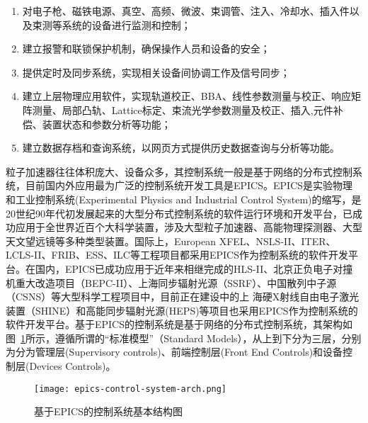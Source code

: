 \begin{enumerate}[itemindent=1em,label=(\arabic*)]
	\item 对电子枪、磁铁电源、真空、高频、微波、束调管、注入、冷却水、插入件以及束测等系统的设备进行监测和控制；
	\item 建立报警和联锁保护机制，确保操作人员和设备的安全；
	\item 提供定时及同步系统，实现相关设备间协调工作及信号同步；
	\item 建立上层物理应用软件，实现轨道校正、BBA、线性参数测量与校正、响应矩阵测量、局部凸轨、Lattice标定、束流光学参数测量及校正、插入,元件补偿、装置状态和参数分析等功能；
	\item 建立数据存档和查询系统，以网页方式提供历史数据查询与分析等功能。
\end{enumerate}

粒子加速器往往体积庞大、设备众多，其控制系统一般是基于网络的分布式控制系统，目前国内外应用最为广泛的控制系统开发工具是EPICS。EPICS是实验物理和工业控制系统(Experimental Physics and Industrial Control System)的缩写，是20世纪90年代初发展起来的大型分布式控制系统的软件运行环境和开发平台，已成功应用于全世界近百个大科学装置，涉及大型粒子加速器、高能物理探测器、大型天文望远镜等多种类型装置\cite{EPICS}。国际上，European XFEL、NSLS-II、ITER、LCLS-II、FRIB、ESS、ILC等工程项目都采用EPICS作为控制系统的软件开发平台\cite{Aghababyan2015,Carcassi2009,Wallander,Flath2017,Shen2016,Arredondo2013,carwardine-2007}。在国内，EPICS已成功应用于近年来相继完成的HLS-II、北京正负电子对撞机重大改造项目（BEPC-II）、上海同步辐射光源（SSRF）、中国散列中子源（CSNS）等大型科学工程项目中\cite{liweimin-control-2007, Zhao2007,Shen2010,C.H.Wang2011}，目前正在建设中的上
海硬X射线自由电子激光装置（SHINE）和高能同步辐射光源(HEPS)等项目也采用EPICS作为控制系统的软件开发平台\cite{Lv2018a,Chu2018a}。基于EPICS的控制系统是基于网络的分布式控制系统，其架构如图~\ref{fig:epics-control-system-arch}所示，遵循所谓的“标准模型”（Standard Models），从上到下分为三层，分别为分为管理层(Supervisory controls)、前端控制层(Front End Controls)和设备控制层(Devices Controls)\cite{Kuiper1991}。

\begin{figure}[!htb]
	\centering
	\texttt{[image: epics-control-system-arch.png]}
	\caption{基于EPICS的控制系统基本结构图}
	\label{fig:epics-control-system-arch}
\end{figure}

